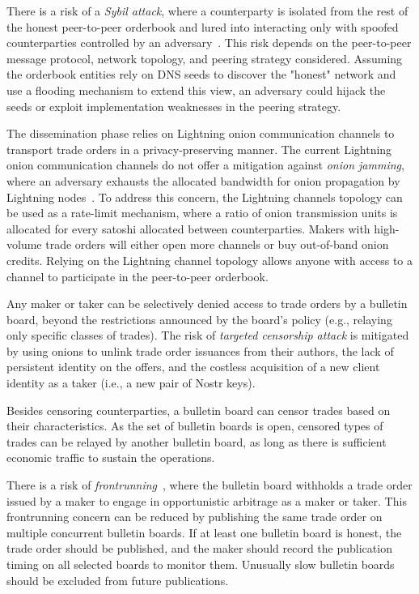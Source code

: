 \documentclass[pdflatex,sn-mathphys]{sn-jnl}%
\theoremstyle{thmstyleone}%
\theoremstyle{thmstyletwo}%
\theoremstyle{thmstylethree}%
\begin{document}
There is a risk of a \textit{Sybil attack}, where a counterparty is isolated from the rest of the honest peer-to-peer orderbook and lured into interacting only with spoofed counterparties controlled by an adversary~\cite{Sybil2002Douceur}. This risk depends on the peer-to-peer message protocol, network topology, and peering strategy considered. Assuming the orderbook entities rely on DNS seeds to discover the "honest" network and use a flooding mechanism to extend this view, an adversary could hijack the seeds or exploit implementation weaknesses in the peering strategy.

The dissemination phase relies on Lightning onion communication channels to transport trade orders in a privacy-preserving manner. The current Lightning onion communication channels do not offer a mitigation against \textit{onion jamming}, where an adversary exhausts the allocated bandwidth for onion propagation by Lightning nodes~\cite{Jamming2022Teinturier}. To address this concern, the Lightning channels topology can be used as a rate-limit mechanism, where a ratio of onion transmission units is allocated for every satoshi allocated between counterparties. Makers with high-volume trade orders will either open more channels or buy out-of-band onion credits. Relying on the Lightning channel topology allows anyone with access to a channel to participate in the peer-to-peer orderbook.

Any maker or taker can be selectively denied access to trade orders by a bulletin board, beyond the restrictions announced by the board's policy (e.g., relaying only specific classes of trades). The risk of \textit{targeted censorship attack} is mitigated by using onions to unlink trade order issuances from their authors, the lack of persistent identity on the offers, and the costless acquisition of a new client identity as a taker (i.e., a new pair of Nostr keys).

Besides censoring counterparties, a bulletin board can censor trades based on their characteristics. As the set of bulletin boards is open, censored types of trades can be relayed by another bulletin board, as long as there is sufficient economic traffic to sustain the operations.

There is a risk of \textit{frontrunning}~\cite{Defi2022Zhou}, where the bulletin board withholds a trade order issued by a maker to engage in opportunistic arbitrage as a maker or taker. This frontrunning concern can be reduced by publishing the same trade order on multiple concurrent bulletin boards. If at least one bulletin board is honest, the trade order should be published, and the maker should record the publication timing on all selected boards to monitor them. Unusually slow bulletin boards should be excluded from future publications.
\end{document}
